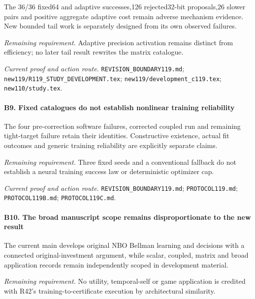 The 36/36 fixed64 and adaptive successes,126 rejected32-bit proposals,26 slower pairs and positive aggregate adaptive cost remain adverse mechanism evidence. New bounded tail work is separately designed from its own observed failures.

\par\emph{Remaining requirement.} Adaptive precision activation remains distinct from efficiency; no later tail result rewrites the matrix catalogue.

\par\emph{Current proof and action route.} \nolinkurl{REVISION_BOUNDARY119.md}; \nolinkurl{new119/R119_STUDY_DEVELOPMENT.tex}; \nolinkurl{new119/development_c119.tex}; \nolinkurl{new110/study.tex}.

\paragraph{B9. Fixed catalogues do not establish nonlinear training reliability}

The four pre-correction software failures, corrected coupled run and remaining tight-target failure retain their identities. Constructive existence, actual fit outcomes and generic training reliability are explicitly separate claims.

\par\emph{Remaining requirement.} Three fixed seeds and a conventional fallback do not establish a neural training success law or deterministic optimizer cap.

\par\emph{Current proof and action route.} \nolinkurl{REVISION_BOUNDARY119.md}; \nolinkurl{PROTOCOL119.md}; \nolinkurl{PROTOCOL119B.md}; \nolinkurl{PROTOCOL119C.md}.

\paragraph{B10. The broad manuscript scope remains disproportionate to the new result}

The current main develops original NBO Bellman learning and decisions with a connected original-investment argument, while scalar, coupled, matrix and broad application records remain independently scoped in development material.

\par\emph{Remaining requirement.} No utility, temporal-self or game application is credited with R42's training-to-certificate execution by architectural similarity.

